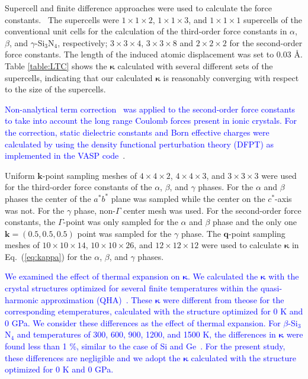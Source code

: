 \documentclass[twocolumn,amsmath,amssymb,a4paper,prb,superscriptaddress,floatfix]{revtex4-1}
\begin{document}
Supercell and finite difference approaches were used to calculate the
force constants.~\cite{wei-supercell} The supercells were $1\times 1\times2$, $1\times
1\times3$, and $1\times 1\times1$ supercells of the conventional unit cells for
the calculation of the third-order force constants in $\alpha$, $\beta$, and
$\gamma$-Si$_3$N$_4$, respectively; $3\times 3\times4$, $3\times
3\times8$ and $2\times 2\times2$ for the second-order force constants.  The length of the
induced atomic displacement was set to 0.03 \AA.  Table \ref{table:LTC} shows
the $\boldsymbol{\kappa}$  calculated with several different sets of the supercells,
indicating that our calculated $\boldsymbol{\kappa}$ is reasonably converging with respect to
the size of the supercells. 

\textcolor{blue}{Non-analytical term correction~\cite{wang} was applied to the
second-order force  constants to take into account the long range Coulomb forces present in
ionic crystals. For the correction, static dielectric constants and Born effective charges were calculated by
using the density functional perturbation theory (DFPT) as implemented in the
VASP code~\cite{vasp-lepsiron,lepsiron}}.

Uniform $\mathbf{k}$-point sampling meshes of $4\times 4\times 2$,
$4\times 4\times 3$, and $3\times 3\times 3$ were used for the
third-order force constants of the $\alpha$, $\beta$, and $\gamma$ phases. For the
$\alpha$ and $\beta$ phases the center of the $a^*b^*$ plane was sampled
while the center on the $c^*$-axis was not. For the
$\gamma$ phase, non-$\Gamma$ center mesh was used. For the second-order
force constants, the $\Gamma$-point was only sampled for the $\alpha$ and $\beta$
phase and the only one $\mathbf{k}=(0.5, 0.5, 0.5)$ point was
sampled for the $\gamma$ phase. The $\mathbf{q}$-point
sampling meshes of $10\times 10\times 14$, $10\times 10\times 26$, and
$12\times 12\times 12$ were used to calculate $\boldsymbol{\kappa}$ in Eq.~(\ref{eq:kappa})
for the $\alpha$, $\beta$, and $\gamma$ phases.

\textcolor {blue}{We examined the effect of thermal expansion on
	$\boldsymbol{\kappa}$. We calculated the $\boldsymbol{\kappa}$ with the crystal structures
optimized for several finite temperatures within the quasi-harmonic
approximation (QHA)~\cite{dove-p76}.  
These $\boldsymbol{\kappa}$ were different from theose for the
corresponding etemperatures, calculated with the structure optimized for 0 K and 0 GPa. We
consider these differences as the effect of thermal expansion.
For $\beta$-Si$_3$N$_4$ and temperatures of 300, 600, 900,
1200, and 1500 K, the differences in $\boldsymbol{\kappa}$ 
were found less than 1 \%, similar to the case of Si and
Ge~\cite{ward-ltc}. For the present study, these differences are negligible
and we adopt the $\boldsymbol{\kappa}$ calculated with the structure
optimized for 0 K and 0 GPa.}
\end{document}
